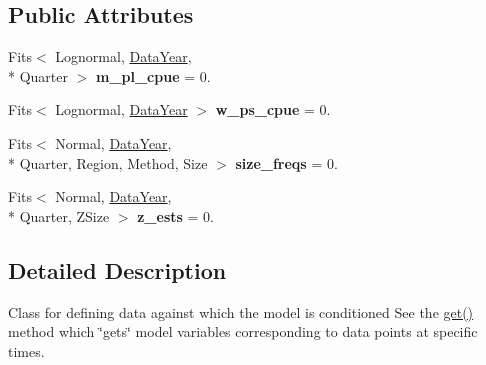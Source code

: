 \subsection*{Public Attributes}
\begin{DoxyCompactItemize}
\item 
\hypertarget{classIOSKJ_1_1Data_aa3b2e824ab3da78d2cdd690f1a4f16d8}{Fits$<$ Lognormal, \hyperlink{classIOSKJ_1_1DataYear}{Data\-Year}, \\*
Quarter $>$ {\bfseries m\-\_\-pl\-\_\-cpue} = 0.}\label{classIOSKJ_1_1Data_aa3b2e824ab3da78d2cdd690f1a4f16d8}

\item 
\hypertarget{classIOSKJ_1_1Data_af9efd9cde37d159fba07a24a0658d129}{Fits$<$ Lognormal, \hyperlink{classIOSKJ_1_1DataYear}{Data\-Year} $>$ {\bfseries w\-\_\-ps\-\_\-cpue} = 0.}\label{classIOSKJ_1_1Data_af9efd9cde37d159fba07a24a0658d129}

\item 
\hypertarget{classIOSKJ_1_1Data_ac4664d2235f7278fd70684ee866c0c7d}{Fits$<$ Normal, \hyperlink{classIOSKJ_1_1DataYear}{Data\-Year}, \\*
Quarter, Region, Method, Size $>$ {\bfseries size\-\_\-freqs} = 0.}\label{classIOSKJ_1_1Data_ac4664d2235f7278fd70684ee866c0c7d}

\item 
\hypertarget{classIOSKJ_1_1Data_ab5a1f2a231f8569312e7d8446709fad7}{Fits$<$ Normal, \hyperlink{classIOSKJ_1_1DataYear}{Data\-Year}, \\*
Quarter, Z\-Size $>$ {\bfseries z\-\_\-ests} = 0.}\label{classIOSKJ_1_1Data_ab5a1f2a231f8569312e7d8446709fad7}

\end{DoxyCompactItemize}


\subsection{Detailed Description}
Class for defining data against which the model is conditioned See the {\ttfamily \hyperlink{classIOSKJ_1_1Data_a36ad666102014528bb511c680cc0db27}{get()}} method which \char`\"{}gets\char`\"{} model variables corresponding to data points at specific times. 

